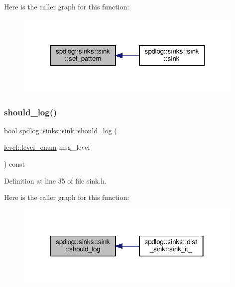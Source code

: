 Here is the caller graph for this function\+:
\nopagebreak
\begin{figure}[H]
\begin{center}
\leavevmode
\includegraphics[width=312pt]{classspdlog_1_1sinks_1_1sink_a7e5cfd4b683c8bfa8fbd602d7f409632_icgraph}
\end{center}
\end{figure}
\mbox{\label{classspdlog_1_1sinks_1_1sink_a1c932f19f67057fbe7518999bdd5c422}} 
\subsubsection{\texorpdfstring{should\+\_\+log()}{should\_log()}}
{\footnotesize\ttfamily bool spdlog\+::sinks\+::sink\+::should\+\_\+log (\begin{DoxyParamCaption}\item[{\hyperlink{namespacespdlog_1_1level_a35f5227e5daf228d28a207b7b2aefc8b}{level\+::level\+\_\+enum}}]{msg\+\_\+level }\end{DoxyParamCaption}) const\hspace{0.3cm}{\ttfamily [inline]}}



Definition at line 35 of file sink.\+h.

Here is the caller graph for this function\+:
\nopagebreak
\begin{figure}[H]
\begin{center}
\leavevmode
\includegraphics[width=310pt]{classspdlog_1_1sinks_1_1sink_a1c932f19f67057fbe7518999bdd5c422_icgraph}
\end{center}
\end{figure}


